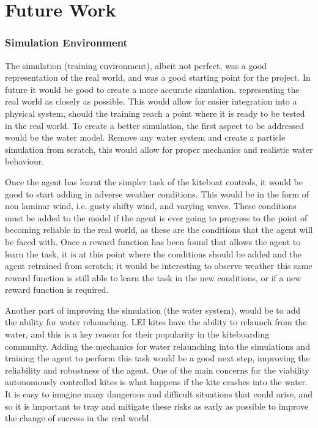 

\let\textcircled=\pgftextcircled\chapter{Future Work}\label{chap:future_work}

\subsection*{Simulation Environment}

The simulation (training environment), albeit not perfect, was a good representation of the real world, and was a good starting point for the project. In future it would be good to create a more accurate simulation, representing the real world as closely as possible. This would allow for easier integration into a physical system, should the training reach a point where it is ready to be tested in the real world. To create a better simulation, the first aspect to be addressed would be the water model. Remove any water system and create a particle simulation from scratch, this would allow for proper mechanics and realistic water behaviour.

Once the agent has learnt the simpler task of the kiteboat controls, it would be good to start adding in adverse weather conditions. This would be in the form of non laminar wind, i.e. gusty shifty wind, and varying waves. These conditions must be added to the model if the agent is ever going to progress to the point of becoming reliable in the real world, as these are the conditions that the agent will be faced with. Once a reward function has been found that allows the agent to learn the task, it is at this point where the conditions should be added and the agent retrained from scratch; it would be interesting to observe weather this same reward function is still able to learn the task in the new conditions, or if a new reward function is required.

Another part of improving the simulation (the water system), would be to add the ability for water relaunching. LEI kites have the ability to relaunch from the water, and this is a key reason for their popularity in the kiteboarding community. Adding the mechanics for water relaunching into the simulations and training the agent to perform this task would be a good next step, improving the reliability and robustness of the agent. One of the main concerns for the viability autonomously controlled kites is what happens if the kite crashes into the water. It is easy to imagine many dangerous and difficult situations that could arise, and so it is important to tray and mitigate these risks as early as possible to improve the change of success in the real world. 


